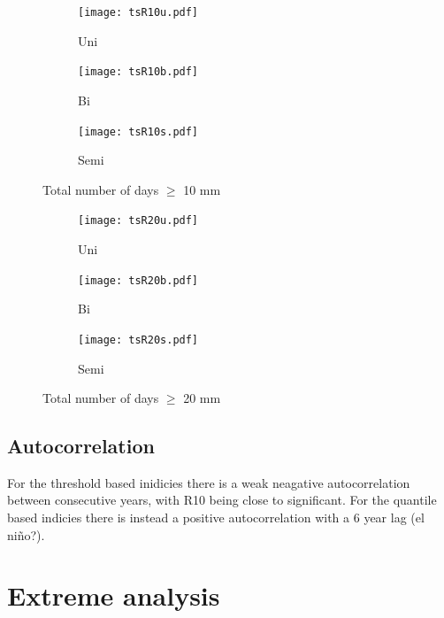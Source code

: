 \documentclass{article}
\begin{document}
\begin{figure}[H]
	\centering
	\begin{subfigure}{0.3\textwidth}
		\centering
		\texttt{[image: tsR10u.pdf]}
		\caption{Uni}
	\end{subfigure}%
	\begin{subfigure}{0.3\textwidth}
		\centering
		\texttt{[image: tsR10b.pdf]}
		\caption{Bi}
	\end{subfigure}%
	\begin{subfigure}{0.3\textwidth}
		\centering
		\texttt{[image: tsR10s.pdf]}
		\caption{Semi}
	\end{subfigure}
	\caption{Total number of days $\geq$ 10 mm}
	\label{modesR10}
\end{figure}

\begin{figure}[H]
	\centering
	\begin{subfigure}{0.3\textwidth}
		\centering
		\texttt{[image: tsR20u.pdf]}
		\caption{Uni}
	\end{subfigure}%
	\begin{subfigure}{0.3\textwidth}
		\centering
		\texttt{[image: tsR20b.pdf]}
		\caption{Bi}
	\end{subfigure}%
	\begin{subfigure}{0.3\textwidth}
		\centering
		\texttt{[image: tsR20s.pdf]}
		\caption{Semi}
	\end{subfigure}
	\caption{Total number of days $\geq$ 20 mm}
	\label{modesR20}
	\end{figure}

	\subsection{Autocorrelation}
	For the threshold based inidicies there is a weak neagative autocorrelation between consecutive years, with R10 being close to significant. For the quantile based indicies there is instead a positive autocorrelation with a 6 year lag (el ni\~{n}o?). 
	
	\section{Extreme analysis}
\end{document}
